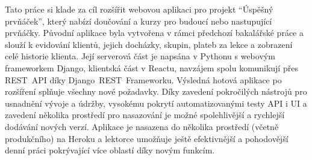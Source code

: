Tato práce si klade za cíl rozšířit webovou aplikaci pro projekt \enquote{Úspěšný prvňáček}, který nabízí doučování a kurzy pro budoucí nebo nastupující prvňáčky. Původní aplikace byla vytvořena v rámci předchozí bakalářské práce a slouží k evidování klientů, jejich docházky, skupin, plateb za lekce a zobrazení celé historie klienta. Její serverová část je napsána v Pythonu s webovým frameworkem Django, klientská část v Reactu, navzájem spolu komunikují přes REST~API díky Django~REST~Frameworku. Výsledná hotová aplikace po rozšíření splňuje všechny nové požadavky. Díky zavedení pokročilých nástrojů pro usnadnění vývoje a údržby, vysokému pokrytí automatizovanými testy API i UI a zavedení několika prostředí pro nasazování je možné spolehlivější a rychlejší dodávání nových verzí. Aplikace je nasazena do několika prostředí (včetně produkčního) na Heroku a lektorce umožňuje ještě efektivnější a pohodovější denní práci pokrývající více oblastí díky novým funkcím.


